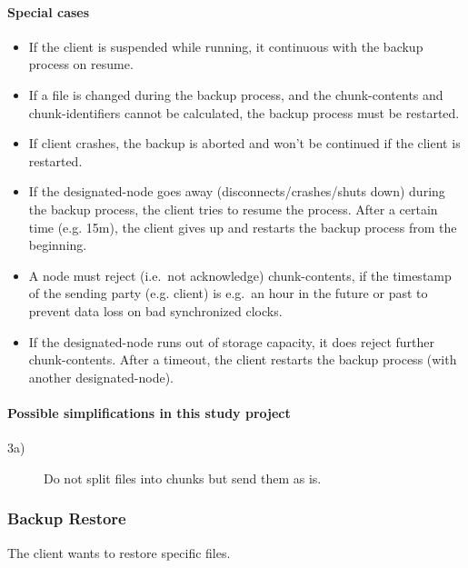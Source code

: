 \paragraph{Special cases}
\begin{itemize}
    \item If the \gls{client} is suspended while running, it continuous with the backup process on resume. %
    \item If a \gls{file} is changed during the backup process, and the \glspl{chunk-content} and \glspl{chunk-identifier} cannot be calculated, the backup process must be restarted. %
    \item If \gls{client} crashes, the backup is aborted and won't be continued if the \gls{client} is restarted.
    \item If the \gls{designated-node} goes away (disconnects/crashes/shuts down) during the backup process, the \gls{client} tries to resume the process. After a certain time (e.g. 15m), the \gls{client} gives up and restarts the backup process from the beginning.
    \item A \gls{node} must reject (i.e.\ not acknowledge) \glspl{chunk-content}, if the timestamp of the sending party (e.g. \gls{client}) is e.g.\ an hour in the future or past to prevent data loss on bad synchronized clocks.
    \item If the \gls{designated-node} runs out of storage capacity, it does reject further \glspl{chunk-content}. After a timeout, the \gls{client} restarts the backup process (with another \gls{designated-node}).
\end{itemize}

\paragraph{Possible simplifications in this study project}
\begin{description}
    \item[3a)] Do not split \glspl{file} into \glspl{chunk} but send them as is.
\end{description}

\subsubsection{Backup Restore}\label{sec:scenario-backup-restore}
The \gls{client} wants to restore specific \glspl{file}.

